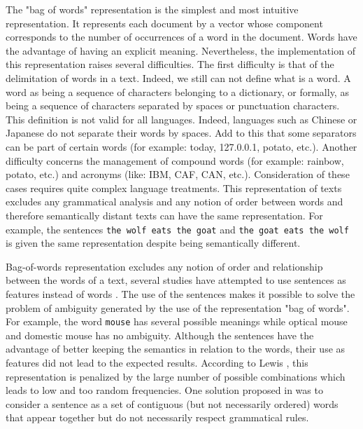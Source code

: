 The "bag of words" representation is the simplest and most intuitive
representation. It represents each document by a vector
whose component corresponds to the number of occurrences of a word in
the document.  Words have the advantage of having an
explicit meaning. Nevertheless, the implementation of this
representation raises several difficulties. The first difficulty is that
of the delimitation of words in a text. Indeed, we still can not define
what is a word. A word as being a sequence of
characters belonging to a dictionary, or formally, as being a sequence
of characters separated by spaces or punctuation characters. This
definition is not valid for all languages. Indeed, languages such as
Chinese or Japanese do not separate their words by spaces. Add to this
that some separators can be part of certain words (for example: today,
127.0.0.1, potato, etc.). Another difficulty concerns the management of
compound words (for example: rainbow, potato, etc.) and acronyms (like:
IBM, CAF, CAN, etc.). Consideration of these cases requires quite
complex language treatments. This representation of texts excludes any
grammatical analysis and any notion of order between words and therefore
semantically distant texts can have the same representation. For
example, the sentences \texttt{the\ wolf\ eats\ the\ goat} and
\texttt{the\ goat\ eats\ the\ wolf} is given the same representation
despite being semantically different.


Bag-of-words representation excludes any notion of order and
relationship between the words of a text, several studies have
attempted to use sentences as features instead of words \cite{fuhr1991probabilistic} \cite{tzeras1993automatic}.
The use of the sentences makes it possible to solve the problem of
ambiguity generated by the use of the representation "bag of words". For
example, the word \texttt{mouse} has several possible meanings while
optical mouse and domestic mouse has no ambiguity. Although the
sentences have the advantage of better keeping the semantics in relation
to the words, their use as features did not lead to the expected
results. According to Lewis \citep{lewis1992representation}, this representation is penalized
by the large number of possible combinations which leads to low and too
random frequencies. One solution proposed in \citep{caropreso2001learner} was to consider a
sentence as a set of contiguous (but not necessarily ordered) words that
appear together but do not necessarily respect grammatical rules.

